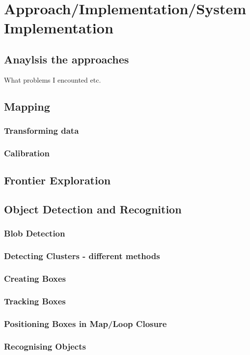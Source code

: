 \documentclass{mproj}
\begin{document}
\chapter{Approach/Implementation/System Implementation}
\section{Anaylsis the approaches}

What problems I encounted etc.

\section{Mapping}
\subsection{Transforming data}
\subsection{Calibration}
\section{Frontier Exploration}
\section{Object Detection and Recognition}
\subsection{Blob Detection} 
\subsection{Detecting Clusters - different methods}
\subsection{Creating Boxes}
\subsection{Tracking Boxes}
\subsection{Positioning Boxes in Map/Loop Closure}
\subsection{Recognising Objects}
\end{document}
